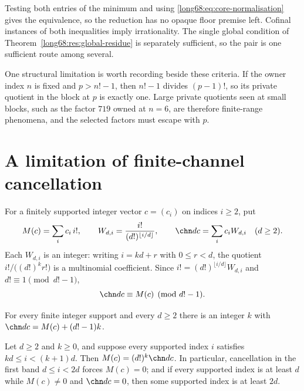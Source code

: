 Testing both entries of the minimum and using
\eqref{long68:eq:core-normalisation} gives the equivalence, so the reduction has no
opaque floor premise left.  Cofinal instances of both inequalities imply
irrationality.  The single global condition of
Theorem~\ref{long68:res:global-residue} is separately sufficient, so the pair is one
sufficient route among several.

\label{long68:res:split-factor-normalized-collision}
\label{long68:bdry:fixed-owner-absorption}
One structural limitation is worth recording beside these criteria.  If the
owner index $n$ is fixed and $p>n!-1$, then $n!-1$ divides $(p-1)!$, so its
private quotient in the block at $p$ is exactly one.  Large private quotients
seen at small blocks, such as the factor $719$ owned at $n=6$, are therefore
finite-range phenomena, and the selected factors must escape with $p$.

\section{A limitation of finite-channel cancellation}\label{long68:sec:channels}

For a finitely supported integer vector $c=(c_i)$ on indices $i\ge2$, put
\[
 M(c)=\sum_i c_i\,i!,\qquad
 W_{d,i}=\frac{i!}{(d!)^{\lfloor i/d\rfloor}},\qquad
 \chn dc=\sum_i c_iW_{d,i}\quad(d\ge2).
\]
Each $W_{d,i}$ is an integer: writing $i=kd+r$ with $0\le r<d$, the quotient
$i!/\bigl((d!)^kr!\bigr)$ is a multinomial coefficient.  Since
$i!=(d!)^{\lfloor i/d\rfloor}W_{d,i}$ and $d!\equiv1\pmod{d!-1}$,
\begin{equation}\label{long68:eq:channel-congruence}
 \chn dc\equiv M(c)\pmod{d!-1}.
\end{equation}

\begin{theorem}\label{long68:res:normalform}
For every finite integer support and every $d\ge2$ there is an integer $k$
with $\chn dc=M(c)+(d!-1)k$.
\end{theorem}

\begin{theorem}\label{long68:res:bandbreakpoint}
Let $d\ge2$ and $k\ge0$, and suppose every supported index $i$ satisfies
$kd\le i<(k+1)d$.  Then $M(c)=(d!)^k\chn dc$.  In particular, cancellation
in the first band $d\le i<2d$ forces $M(c)=0$; and if every supported index
is at least $d$ while $M(c)\ne0$ and $\chn dc=0$, then some supported index
is at least $2d$.
\end{theorem}

